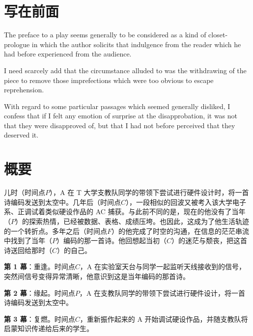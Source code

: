 \documentclass[11pt,a4paper,oneside]{memoir}
\begin{document}
\chapter*{写在前面}

The preface to a play seems generally to be considered as a kind of closet-prologue in which the author solicits that indulgence from the reader which he had before experienced from the audience.

I need scarcely add that the circumstance alluded to was the withdrawing of the piece to remove those imprefections which were too obvious to escape reprehension.

With regard to some particular passages which seemed generally disliked, I confess that if I felt any emotion of surprise at the disapprobation, it was not that they were disapproved of, but that I had not before perceived that they deserved it.

\clearpage
{}

\chapter*{概要}

儿时（时间点\(P\)），A 在 T 大学支教队同学的带领下尝试进行硬件设计时，将一首诗编码发送到太空中。几年后（时间点\(C\)），一段相似的回波又被考入该大学电子系、正调试着类似硬设作品的 AC 捕获。与此前不同的是，现在的他没有了当年（\(P\)）的探索热情，已经被数据、表格、成绩压垮。也因此，这成为了他生活轨迹的一个转折点。多年之后（时间点\(F\)）的他完成了时空的沟通，在信息的茫茫串流中找到了当年（\(P\)）编码的那一首诗。他回想起当初（\(C\)）的迷茫与颓丧，把这首诗送回给那时（\(C\)）的自己。

\textbf{第 1 幕}：重逢。时间点\(C\)，A 在实验室天台与同学一起监听天线接收到的信号，突然间信号变得异常清晰，他意识到这是当年编码的那首诗。

\textbf{第 2 幕}：缘起。时间点\(P\)，A 在支教队同学的带领下尝试进行硬件设计，将一首诗编码发送到太空中。

\textbf{第 3 幕}：复燃。时间点\(C\)，重新振作起来的 A 开始调试硬设作品，并随支教队将启蒙知识传递给后来的学生。
\end{document}
